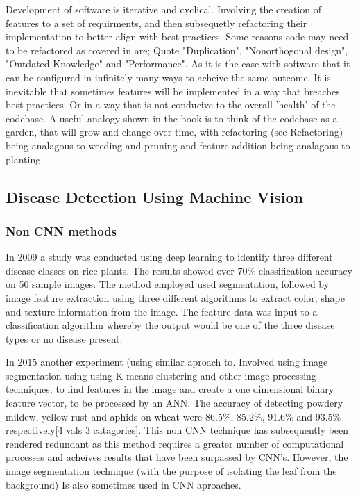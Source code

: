     \par
    Development of software is iterative and cyclical. Involving the creation of features to a set of requirments, and then subsequetly refactoring their implementation to better align with best practices. Some reasons code may need to be refactored as covered in \cite{hunt2000pragmatic} are; Quote "Duplication", "Nonorthogonal design", "Outdated Knowledge" and "Performance". As it is the case with software that it can be configured in infinitely many ways to acheive the same outcome. It is inevitable that sometimes features will be implemented in a way that breaches best practices. Or in a way that is not conducive to the overall 'health' of the codebase. A useful analogy shown in the book is to think of the codebase as a garden, that will grow and change over time, with refactoring (see Refactoring) being analagous to weeding and pruning and feature addition being analagous to planting.

  \subsection{Disease Detection Using Machine Vision}
  \subsubsection{Non CNN methods}
    In 2009 a study was conducted using deep learning to identify three different disease classes on rice plants. The results showed over 70\% classification accuracy on 50 sample images. The method employed used segmentation, followed by image feature extraction using three different algorithms to extract color, shape and texture information from the image. The feature data was input to a classification algorithm whereby the output would be one of the three disease types or no disease present. \cite{Anthonys2009}
    \par
    In 2015 another experiment (using similar aproach to\cite{Anthonys2009}. Involved using image segmentation
    using using K means clustering and other image processing techniques, to find features in the image and create a one dimensional binary feature vector, to be processed by an ANN. \cite{Khirade2015} The accuracy of detecting powdery mildew, yellow rust and aphids on wheat were 86.5\%, 85.2\%, 91.6\% and 93.5\% respectively[4 vals 3 catagories].
    This non CNN technique has subsequently been rendered redundant as this method requires a greater number of
    computational processes and acheives results that have been surpassed by CNN's. However, the image segmentation technique (with the purpose of isolating the leaf from the background) Is also sometimes used in CNN aproaches.

